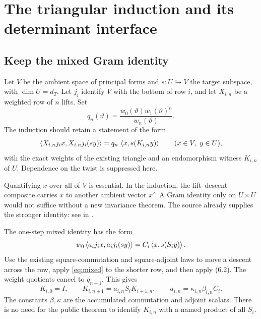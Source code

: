\section{The triangular induction and its determinant interface}
\label{sec:triangle}

\subsection{Keep the mixed Gram identity}

Let \(V\) be the ambient space of principal forms and
\(s:U\hookrightarrow V\) the target subspace, with \(\dim U=d_T\).
Let \(j_i\) identify \(V\) with the bottom of row \(i\), and let
\(X_{i,n}\) be a weighted row of \(n\) lifts. Set
\[
 q_n(\vartheta)=
 \frac{w_0(\vartheta)w_1(\vartheta)^n}{w_n(\vartheta)}.
\]
The induction should retain a statement of the form
\begin{equation}
 \left\langle X_{i,n}j_i x,X_{i,n}j_i(sy)\right\rangle
   =q_n\,\left\langle x,s(K_{i,n}y)\right\rangle
 \qquad (x\in V,\ y\in U),
 \label{eq:mixed}
\end{equation}
with the exact weights of the existing triangle and an endomorphism witness
\(K_{i,n}\) of \(U\). Dependence on the twist is suppressed here.

Quantifying \(x\) over all of \(V\) is essential. In the induction, the
lift--descent composite carries \(x\) to another ambient vector \(x'\).
A Gram identity only on \(U\times U\) would not suffice without a new
invariance theorem. The source already supplies the stronger identity:
see  in
.

The one-step mixed identity has the form
\begin{equation}
 w_0\left\langle a_i j_i x,a_i j_i(sy)\right\rangle
       =C_i\left\langle x,s(S_i y)\right\rangle.
\end{equation}
Use the existing square-commutation and square-adjoint laws to move a
descent across the row, apply \eqref{eq:mixed} to the shorter row, and then
apply (6.2). The weight quotients cancel to \(q_{n+1}\). This gives
\begin{equation}
 K_{i,0}=I,\qquad
 K_{i,n+1}=a_{i,n}S_iK_{i+1,n},
 \qquad a_{i,n}=\kappa_{i,n}\beta_{i,n}C_i.
\end{equation}
The constants \(\beta,\kappa\) are the accumulated commutation and adjoint
scalars. There is no need for the public theorem to identify \(K_{i,n}\)
with a named product of all \(S_i\).

